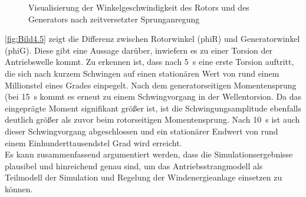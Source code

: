 \begin{figure}[H]
   \centering
   \caption[Winkelgeschwindigkeiten Antriebsstrang]{Visualisierung der Winkelgeschwindigkeit des Rotors und des Generators nach zeitversetzter Sprunganregung}
   \label{fig:Bild4.4}
\end{figure}

\autoref{fig:Bild4.5} zeigt die Differenz zwischen Rotorwinkel (\acs{phiR}) und Generatorwinkel (\ac{phiG}). Diese gibt eine Aussage darüber, inwiefern es zu einer Torsion der Antriebswelle kommt. Zu erkennen ist, dass nach \SI{5}{s} eine erste Torsion auftritt, die sich nach kurzem Schwingen auf einen stationären Wert von rund einem Millionstel eines Grades einpegelt. Nach dem generatorseitigen Momentensprung (bei \SI{15}{s} kommt es erneut zu einem Schwingvorgang in der Wellentorsion. Da das eingeprägte Moment signifikant größer ist, ist die Schwingungsamplitude ebenfalls deutlich größer als zuvor beim rotorseitigen Momentensprung. Nach \ca \SI{10}{s} ist auch dieser Schwingvorgang abgeschlossen und ein stationärer Endwert von rund einem Einhunderttausendstel Grad wird erreicht. \\
Es kann zusammenfassend argumentiert werden, dass die Simulationsergebnisse plausibel und hinreichend genau sind, um das Antriebsstrangmodell als Teilmodell der Simulation und Regelung der Windenergieanlage einsetzen zu können.

